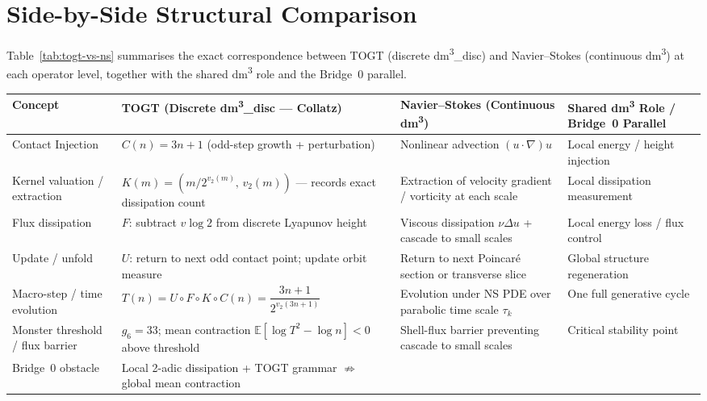 \documentclass[11pt,a4paper]{article}
\theoremstyle{definition}
\theoremstyle{plain}
\begin{document}
\section{Side-by-Side Structural Comparison}
\label{sec:table}

Table~\ref{tab:togt-vs-ns} summarises the exact correspondence between TOGT (discrete
dm\textsuperscript{3}\_disc) and Navier--Stokes (continuous dm\textsuperscript{3}) at each
operator level, together with the shared dm\textsuperscript{3} role and the Bridge~0 parallel.

\begin{table}[ht]
\centering
\small
\begin{tabular}{@{}p{3.2cm}p{4.1cm}p{4.1cm}p{4.1cm}@{}}
\toprule
\textbf{Concept}
  & \textbf{TOGT (Discrete dm\textsuperscript{3}\_disc --- Collatz)}
  & \textbf{Navier--Stokes (Continuous dm\textsuperscript{3})}
  & \textbf{Shared dm\textsuperscript{3} Role / Bridge~0 Parallel} \\
\midrule
Contact Injection
  & $C(n)=3n+1$ (odd-step growth + perturbation)
  & Nonlinear advection $(u\cdot\nabla)u$
  & Local energy / height injection \\[4pt]
Kernel valuation / extraction
  & $K(m)=(m/2^{v_2(m)},\,v_2(m))$ --- records exact dissipation count
  & Extraction of velocity gradient / vorticity at each scale
  & Local dissipation measurement \\[4pt]
Flux dissipation
  & $F$: subtract $v\log 2$ from discrete Lyapunov height
  & Viscous dissipation $\nu\Delta u$ + cascade to small scales
  & Local energy loss / flux control \\[4pt]
Update / unfold
  & $U$: return to next odd contact point; update orbit measure
  & Return to next Poincar\'e section or transverse slice
  & Global structure regeneration \\[4pt]
Macro-step / time evolution
  & $T(n)=U\circ F\circ K\circ C(n)=\dfrac{3n+1}{2^{v_2(3n+1)}}$
  & Evolution under NS PDE over parabolic time scale $\tau_k$
  & One full generative cycle \\[8pt]
Monster threshold / flux barrier
  & $g_6=33$; mean contraction $\mathbb{E}[\log T^2-\log n]<0$ above threshold
  & Shell-flux barrier preventing cascade to small scales
  & Critical stability point \\[4pt]
Bridge~0 obstacle
  & Local 2-adic dissipation + TOGT grammar $\not\Rightarrow$ global mean contraction

\end{tabular}
\end{table}
\end{document}
